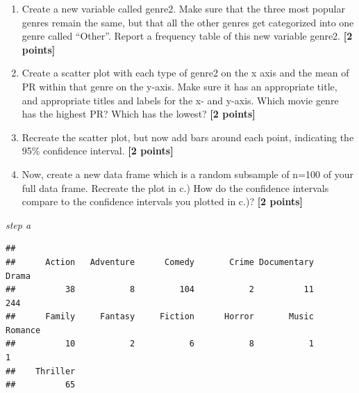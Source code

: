 \documentclass[
]{article}
\newenvironment{Shaded}{\begin{snugshade}}{\end{snugshade}}
\newcommand{\AttributeTok}[1]{\textcolor[rgb]{0.13,0.29,0.53}{#1}}
\newcommand{\FunctionTok}[1]{\textcolor[rgb]{0.13,0.29,0.53}{\textbf{#1}}}
\newcommand{\NormalTok}[1]{#1}
\newcommand{\OtherTok}[1]{\textcolor[rgb]{0.56,0.35,0.01}{#1}}
\newcommand{\SpecialCharTok}[1]{\textcolor[rgb]{0.81,0.36,0.00}{\textbf{#1}}}
\newcommand{\StringTok}[1]{\textcolor[rgb]{0.31,0.60,0.02}{#1}}
\providecommand{\tightlist}{%
  \setlength{\itemsep}{0pt}\setlength{\parskip}{0pt}}
\begin{document}
\begin{enumerate}
\def\labelenumi{\alph{enumi}.}
\tightlist
\item
  Create a new variable called genre2. Make sure that the three most
  popular genres remain the same, but that all the other genres get
  categorized into one genre called ``Other''. Report a frequency table
  of this new variable genre2. \textbf{[2 points]}
\item
  Create a scatter plot with each type of genre2 on the x axis and the
  mean of PR within that genre on the y-axis. Make sure it has an
  appropriate title, and appropriate titles and labels for the x- and
  y-axis. Which movie genre has the highest PR? Which has the lowest?
  \textbf{[2 points]}
\item
  Recreate the scatter plot, but now add bars around each point,
  indicating the 95\% confidence interval. \textbf{[2 points]}
\item
  Now, create a new data frame which is a random subsample of n=100 of
  your full data frame. Recreate the plot in c.) How do the confidence
  intervals compare to the confidence intervals you plotted in c.)?
  \textbf{[2 points]}
\end{enumerate}

\emph{step a}

\begin{Shaded}
\end{Shaded}

\begin{verbatim}
## 
##      Action   Adventure      Comedy       Crime Documentary       Drama 
##          38           8         104           2          11         244 
##      Family     Fantasy     Fiction      Horror       Music     Romance 
##          10           2           6           8           1           1 
##    Thriller 
##          65
\end{verbatim}

\begin{Shaded}
\end{Shaded}
\end{document}

